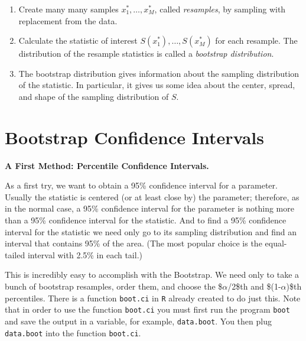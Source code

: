 \documentclass[11pt,english]{scrbook}
\begin{document}
\begin{enumerate}
\item Create many many samples \(x_{1}^{\ast},\ldots,x_{M}^{\ast}\), called \emph{resamples}, by sampling with replacement from the data.

\item Calculate the statistic of interest \(S(x_{1}^{\ast}),\ldots,S(x_{M}^{\ast})\) for each resample. The distribution of the resample statistics is called a \emph{bootstrap distribution}.

\item The bootstrap distribution gives information about the sampling distribution of the statistic. In particular, it gives us some idea about the center, spread, and shape of the sampling distribution of \(S\).
\end{enumerate}














\section{Bootstrap Confidence Intervals}
\label{sec:orgcf576ad}

\textbf{A First Method: Percentile Confidence Intervals.}

As a first try, we want to obtain a 95\% confidence interval for a parameter. Usually the statistic is centered (or at least close by) the parameter; therefore, as in the normal case, a 95\% confidence interval for the parameter is nothing more than a 95\% confidence interval for the statistic. And to find a 95\% confidence interval for the statistic we need only go to its sampling distribution and find an interval that contains 95\% of the area. (The most popular choice is the equal-tailed interval with 2.5\% in each tail.)

This is incredibly easy to accomplish with the Bootstrap. We need only to take a bunch of bootstrap resamples, order them, and choose the \$\(\alpha\)/2\$th and \$(1-\(\alpha\))\$th percentiles. There is a function \texttt{boot.ci} in \texttt{R} already created to do just this. Note that in order to use the function \texttt{boot.ci} you must first run the program \texttt{boot} and save the output in a variable, for example, \texttt{data.boot}.  You then plug \texttt{data.boot} into the function \texttt{boot.ci}.
\end{document}
